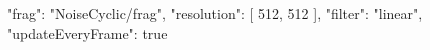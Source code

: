 {
  "frag": "NoiseCyclic/frag",
  "resolution": [
    512,
    512
  ],
  "filter": "linear",
  "updateEveryFrame": true
}